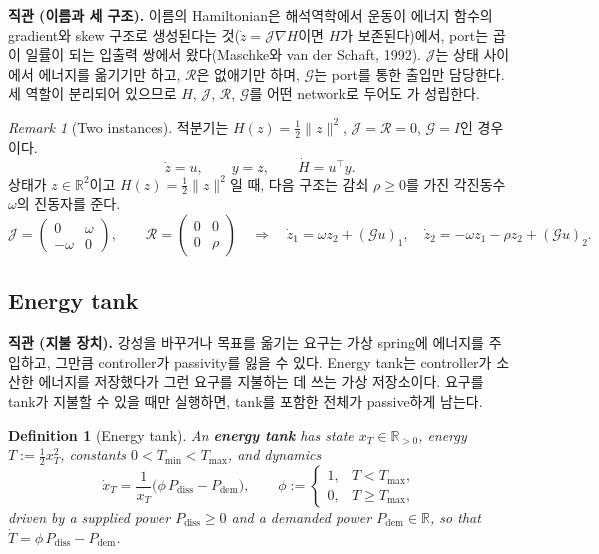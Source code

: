 \documentclass[11pt]{article}\usepackage[margin=1in]{geometry}\usepackage{amsmath,amssymb,amsthm,mathtools}\usepackage{graphicx}\graphicspath{{figures/}{../figures/}{figs/}{./}}\usepackage{enumitem}\usepackage{hyperref}\usepackage{cleveref}\usepackage{tikz}\usetikzlibrary{arrows.meta,positioning,calc,shapes.geometric}\usepackage{float}\usepackage{rotating}\usepackage[most]{tcolorbox}\usepackage{kotex}\usepackage{booktabs}\usepackage{longtable}\emergencystretch=1.6em\tolerance=2000 \crefname{assumption}{Assumption}{Assumptions}\Crefname{assumption}{Assumption}{Assumptions}\crefname{definition}{Definition}{Definitions}\Crefname{definition}{Definition}{Definitions}\crefname{proposition}{Proposition}{Propositions}\Crefname{proposition}{Proposition}{Propositions}\crefname{fact}{Fact}{Facts}\Crefname{fact}{Fact}{Facts} \newtheorem{assumption}{Assumption}\newtheorem{definition}{Definition}\newtheorem{lemma}{Lemma}\newtheorem{proposition}{Proposition}\newtheorem{theorem}{Theorem}\newtheorem{corollary}{Corollary}\newtheorem{fact}{Fact}\theoremstyle{remark}\newtheorem{remark}{Remark} \newcommand{\R}{\mathbb{R}}\newcommand{\xb}{\bar x}\newcommand{\Ab}{\bar A}\newcommand{\By}{\bar B_y}\newcommand{\U}{\mathcal U}\newcommand{\Z}{\mathcal Z}
\begin{document}
\textbf{직관 (이름과 세 구조).} 이름의 Hamiltonian은 해석역학에서 운동이 에너지 함수의 gradient와 skew 구조로 생성된다는 것($\dot z=\mathcal J\nabla H$이면 $H$가 보존된다)에서, port는 곱이 일률이 되는 입출력 쌍에서 왔다(Maschke와 van der Schaft, 1992). $\mathcal J$는 상태 사이에서 에너지를 옮기기만 하고, $\mathcal R$은 없애기만 하며, $\mathcal G$는 port를 통한 출입만 담당한다. 세 역할이 분리되어 있으므로 $H$, $\mathcal J$, $\mathcal R$, $\mathcal G$를 어떤 network로 두어도 가 성립한다.

\begin{remark}[Two instances]
\label{rem:phex}
적분기는 $H(z)=\tfrac12\|z\|^2$, $\mathcal J=\mathcal R=0$, $\mathcal G=I$인 경우이다.
\[
\dot z=u,\qquad y=z,\qquad \dot H=u^\top y .
\]
상태가 $z\in\R^2$이고 $H(z)=\tfrac12\|z\|^2$일 때, 다음 구조는 감쇠 $\rho\ge0$를 가진 각진동수 $\omega$의 진동자를 준다.
\[
\mathcal J=\begin{pmatrix}0&\omega\\-\omega&0\end{pmatrix},\qquad \mathcal R=\begin{pmatrix}0&0\\0&\rho\end{pmatrix}\quad\Longrightarrow\quad \dot z_1=\omega z_2+(\mathcal Gu)_1,\quad \dot z_2=-\omega z_1-\rho z_2+(\mathcal Gu)_2 .
\]
\end{remark}

\subsection{Energy tank}
\label{sec:tankdef}

\textbf{직관 (지불 장치).} 강성을 바꾸거나 목표를 옮기는 요구는 가상 spring에 에너지를 주입하고, 그만큼 controller가 passivity를 잃을 수 있다. Energy tank는 controller가 소산한 에너지를 저장했다가 그런 요구를 지불하는 데 쓰는 가상 저장소이다. 요구를 tank가 지불할 수 있을 때만 실행하면, tank를 포함한 전체가 passive하게 남는다.

\begin{definition}[Energy tank]
\label{def:tank}
An \textbf{\emph{energy tank}} has state $x_T\in\R_{>0}$, energy $T:=\tfrac12x_T^2$, constants $0<T_{\min}<T_{\max}$, and dynamics
\[
\dot x_T=\frac{1}{x_T}\big(\phi\,P_{\mathrm{diss}}-P_{\mathrm{dem}}\big),\qquad \phi:=\begin{cases}1,&T<T_{\max},\\0,&T\ge T_{\max},\end{cases}
\]
driven by a supplied power $P_{\mathrm{diss}}\ge0$ and a demanded power $P_{\mathrm{dem}}\in\R$, so that $\dot T=\phi\,P_{\mathrm{diss}}-P_{\mathrm{dem}}$.
\end{definition}
\end{document}
